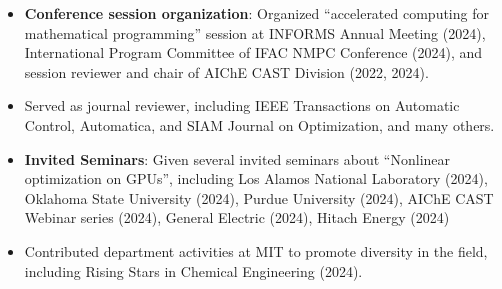 \documentclass[letterpaper, 11pt]{article}
\begin{document}
\begin{itemize}[itemsep=1pt, parsep=0pt,leftmargin=*]
\item[] \textbf{Conference session organization}: Organized ``accelerated computing for mathematical programming'' session at INFORMS Annual Meeting (2024), International Program Committee of IFAC NMPC Conference (2024), and session reviewer and chair of AIChE CAST Division (2022, 2024).
\item Served as journal reviewer, including IEEE Transactions on Automatic Control, Automatica, and SIAM Journal on Optimization, and many others.
\item[] \textbf{Invited Seminars}: Given several invited seminars about ``Nonlinear optimization on GPUs'', including Los Alamos National Laboratory (2024), Oklahoma State University (2024), Purdue University (2024), AIChE CAST Webinar series (2024), General Electric (2024), Hitach Energy (2024)
\item Contributed department activities at MIT to promote diversity in the field, including Rising Stars in Chemical Engineering (2024). 
\end{itemize}





\end{document}
